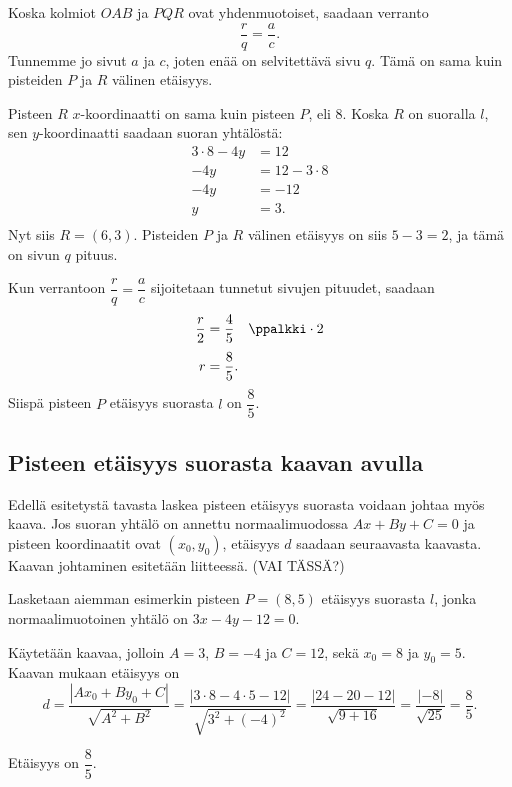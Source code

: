 Koska kolmiot $OAB$ ja $PQR$ ovat yhdenmuotoiset, saadaan verranto
\[
\frac{r}{q}=\frac{a}{c}.
\]
Tunnemme jo sivut $a$ ja $c$, joten enää on selvitettävä sivu $q$. Tämä on sama kuin pisteiden $P$ ja $R$ välinen etäisyys.

Pisteen $R$ $x$-koordinaatti on sama kuin pisteen $P$, eli 8. Koska $R$ on suoralla $l$, sen $y$-koordinaatti saadaan suoran yhtälöstä:
\begin{align*}
3\cdot 8-4y & =12 \\
-4y & =12-3\cdot 8 \\
-4y & =-12 \\
y & =3. \\
\end{align*}
Nyt siis $R=(6,3)$. Pisteiden $P$ ja $R$ välinen etäisyys on siis $5-3=2$, ja tämä on sivun $q$ pituus.

Kun verrantoon $\dfrac{r}{q}=\dfrac{a}{c}$ sijoitetaan tunnetut sivujen pituudet, saadaan
\begin{align*}
\frac{r}{2} & =\frac{4}{5} \quad \ppalkki \cdot 2 \\[3pt]
r & =\frac{8}{5}.
\end{align*}
Siispä pisteen $P$ etäisyys suorasta $l$ on $\dfrac{8}{5}$.

\subsection*{Pisteen etäisyys suorasta kaavan avulla}

Edellä esitetystä tavasta laskea pisteen etäisyys suorasta voidaan johtaa myös kaava.
Jos suoran yhtälö on annettu normaalimuodossa $Ax+By+C=0$ ja pisteen koordinaatit ovat $(x_0,y_0)$, etäisyys $d$ saadaan seuraavasta kaavasta.
\laatikko{
\[
d=\frac{|Ax_0+By_0+C|}{\sqrt{A^2+B^2}}
\]
}
Kaavan johtaminen esitetään liitteessä. (VAI TÄSSÄ?)

\begin{esimerkki} Lasketaan aiemman esimerkin pisteen $P=(8,5)$ etäisyys suorasta $l$, jonka normaalimuotoinen yhtälö on $3x-4y-12=0$.
\begin{esimratk}
Käytetään kaavaa, jolloin $A=3$, $B=-4$ ja $C=12$, sekä $x_0=8$ ja $y_0=5$. Kaavan mukaan etäisyys on
\[
d=\frac{|Ax_0+By_0+C|}{\sqrt{A^2+B^2}}
=\frac{|3\cdot 8-4\cdot 5-12|}{\sqrt{3^2+(-4)^2}}
=\frac{|24-20-12|}{\sqrt{9+16}}=\frac{|-8|}{\sqrt{25}}
=\frac{8}{5}.
\]
\end{esimratk}
\begin{esimvast}
Etäisyys on $\dfrac{8}{5}$.
\end{esimvast}
\end{esimerkki}

